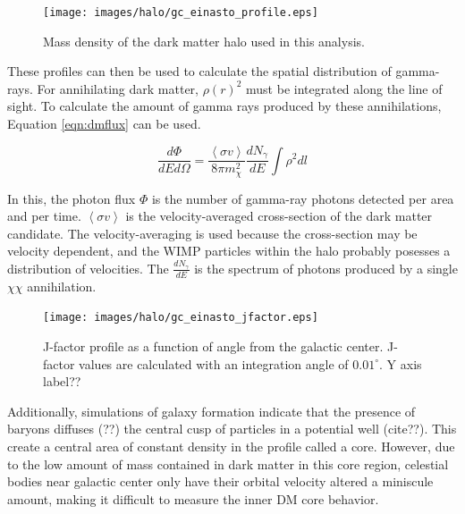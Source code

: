     \begin{figure}[ht]
      \centering
      \texttt{[image: images/halo/gc\_einasto\_profile.eps]}
      \caption[Galactic Center Einasto Halo Density]{
        Mass density of the dark matter halo used in this analysis.}
      \label{fig:gchalo_density}
    \end{figure}
    
    These profiles can then be used to calculate the spatial distribution of gamma-rays.
    For annihilating dark matter, $\rho\left(r\right)^2$ must be integrated along the line of sight.
    To calculate the amount of gamma rays produced by these annihilations, Equation \ref{eqn:dmflux} can be used.
    
    \begin{equation}\label{eqn:dmflux}
      \frac{ d\Phi }{ dE d \Omega } = \frac{ \left \langle \sigma v \right \rangle }{8 \pi m_\chi^2} \frac{dN_{\gamma}}{dE} \int \rho^2 dl
    \end{equation}
    
    In this, the photon flux $\Phi$ is the number of gamma-ray photons detected per area and per time.
    $\left \langle \sigma v \right \rangle$ is the velocity-averaged cross-section of the dark matter candidate.
    The velocity-averaging is used because the cross-section may be velocity dependent, and the WIMP particles within the halo probably posesses a distribution of velocities.
    The $\frac{dN_{\gamma}}{dE}$ is the spectrum of photons produced by a single $\chi\chi$ annihilation.
    
    \begin{figure}[ht]
    \centering
      \texttt{[image: images/halo/gc\_einasto\_jfactor.eps]}
      \caption[Galactic Center Einasto Halo Jfactor]{
        J-factor profile as a function of angle from the galactic center.
        J-factor values are calculated with an integration angle of ${0.01}^{\circ}$.
        {\color{red}Y axis label??}
      }
      \label{fig:gchalo_jfactor}
    \end{figure}
    
    Additionally, simulations of galaxy formation indicate that the presence of baryons diffuses {\color{red}(??)} the central cusp of particles in a potential well {\color{red}(cite??)}.
    This create a central area of constant density in the profile called a core.
    However, due to the low amount of mass contained in dark matter in this core region, celestial bodies near galactic center only have their orbital velocity altered a miniscule amount, making it difficult to measure the inner DM core behavior.

